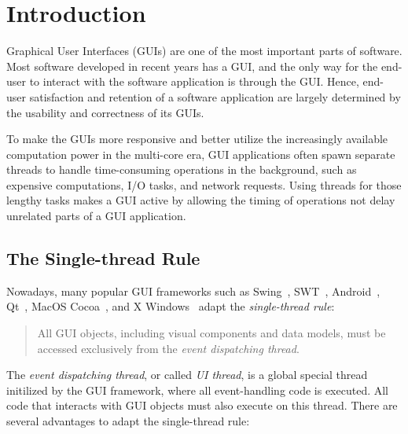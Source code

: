 \section{Introduction}

Graphical User Interfaces (GUIs) are one of the most important parts of
software. Most software developed in recent years has a GUI, and the only
way for the end-user to interact with the software application is through
the GUI. Hence, end-user satisfaction and retention of a software application
 are largely determined by the usability and correctness of
its GUIs.

To make the GUIs more responsive and better utilize the increasingly available
computation power in the multi-core era, GUI applications often spawn separate
threads to handle time-consuming operations in the background, such as expensive
computations, I/O tasks, and network requests. Using threads for those lengthy tasks
makes a GUI active by allowing the timing of operations not delay unrelated parts of a 
GUI application.



\subsection{The Single-thread Rule}

Nowadays, many popular GUI frameworks such as Swing~\cite{swing}, SWT~\cite{swt}, Android~\cite{android},
Qt~\cite{qt}, MacOS Cocoa~\cite{macos}, and X Windows~\cite{xwindow} 
adapt the \textit{single-thread rule}:

\vspace{-2mm}

\begin{quote}
All GUI objects, including visual components and data models, must be
 accessed exclusively from the \textit{event dispatching thread}.
\end{quote}

\vspace{-2mm}

The \textit{event dispatching thread}, or called \textit{UI thread}, is a global special
thread initilized by the GUI framework, where all event-handling code
is executed. All code that interacts with GUI objects must also
execute on this thread.  There are several advantages to adapt the single-thread rule:

